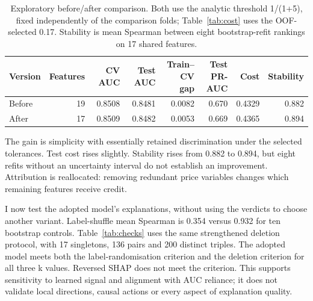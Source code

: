 \documentclass[10pt,a4paper]{article}
\begin{document}
\begin{table}[H]
\centering\small
\setlength{\tabcolsep}{4pt}
\begin{tabular*}{\linewidth}{@{\extracolsep{\fill}}lrrrrrrr@{}}
\toprule
Version & Features & CV AUC & Test AUC & \shortstack[r]{Train--CV\\gap} & \shortstack[r]{Test\\PR-AUC} & Cost & Stability \\
\midrule
Before & 19 & 0.8508 & 0.8481 & 0.0082 & 0.670 & 0.4329 & 0.882 \\
After & 17 & 0.8509 & 0.8482 & 0.0053 & 0.669 & 0.4365 & 0.894 \\
\bottomrule
\end{tabular*}
\caption{Exploratory before/after comparison. Both use
the analytic threshold 1/(1+5), fixed independently of the comparison
folds; Table~\ref{tab:cost} uses the OOF-selected 0.17. Stability is mean Spearman
between eight bootstrap-refit rankings on 17 shared
features.}
\label{tab:improvement}
\end{table}

The gain is simplicity with essentially retained discrimination under
the selected tolerances. Test cost rises slightly. Stability rises from
0.882 to 0.894, but eight refits without an uncertainty interval do not
establish an improvement. Attribution is reallocated: removing redundant
price variables changes which remaining features receive credit.

I now test the adopted model's explanations, without using the verdicts
to choose another variant. Label-shuffle mean Spearman is 0.354 versus
0.932 for ten bootstrap controls. Table~\ref{tab:checks} uses the same strengthened
deletion protocol, with 17 singletons, 136 pairs and 200 distinct
triples. The adopted model meets both the label-randomisation criterion
and the deletion criterion for all three k values. Reversed SHAP does
not meet the criterion. This supports sensitivity to learned signal and
alignment with AUC reliance; it does not validate local directions,
causal actions or every aspect of explanation quality.
\end{document}
